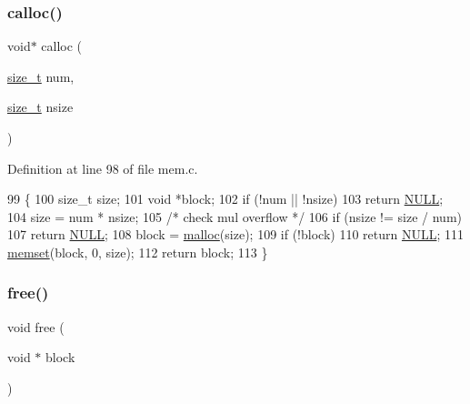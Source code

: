 \subsubsection{\texorpdfstring{calloc()}{calloc()}}
{\footnotesize\ttfamily void$\ast$ calloc (\begin{DoxyParamCaption}\item[{\hyperlink{a00134_a29d85914ddff32967d85ada69854206d_a29d85914ddff32967d85ada69854206d}{size\+\_\+t}}]{num,  }\item[{\hyperlink{a00134_a29d85914ddff32967d85ada69854206d_a29d85914ddff32967d85ada69854206d}{size\+\_\+t}}]{nsize }\end{DoxyParamCaption})}



Definition at line 98 of file mem.\+c.


\begin{DoxyCode}
99 \{
100     \textcolor{keywordtype}{size\_t} size;
101     \textcolor{keywordtype}{void} *block;
102     \textcolor{keywordflow}{if} (!num || !nsize)
103         \textcolor{keywordflow}{return} \hyperlink{a00134_a070d2ce7b6bb7e5c05602aa8c308d0c4_a070d2ce7b6bb7e5c05602aa8c308d0c4}{NULL};
104     size = num * nsize;
105     \textcolor{comment}{/* check mul overflow */}
106     \textcolor{keywordflow}{if} (nsize != size / num)
107         \textcolor{keywordflow}{return} \hyperlink{a00134_a070d2ce7b6bb7e5c05602aa8c308d0c4_a070d2ce7b6bb7e5c05602aa8c308d0c4}{NULL};
108     block = \hyperlink{a00161_a7ac38fce3243a7dcf448301ee9ffd392_a7ac38fce3243a7dcf448301ee9ffd392}{malloc}(size);
109     \textcolor{keywordflow}{if} (!block)
110         \textcolor{keywordflow}{return} \hyperlink{a00134_a070d2ce7b6bb7e5c05602aa8c308d0c4_a070d2ce7b6bb7e5c05602aa8c308d0c4}{NULL};
111     \hyperlink{a00125_a9e432f267691eceb2e2e0efcc37efbc9_a9e432f267691eceb2e2e0efcc37efbc9}{memset}(block, 0, size);
112     \textcolor{keywordflow}{return} block;
113 \}
\end{DoxyCode}
\mbox{\label{a00161_abbcfa46e4bdcb73aecd859a389031a02_abbcfa46e4bdcb73aecd859a389031a02}} 
\subsubsection{\texorpdfstring{free()}{free()}}
{\footnotesize\ttfamily void free (\begin{DoxyParamCaption}\item[{void $\ast$}]{block }\end{DoxyParamCaption})}



